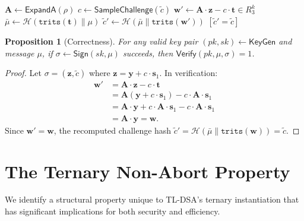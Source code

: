\documentclass[11pt,a4paper]{article}
\newtheorem{proposition}[theorem]{Proposition}
\theoremstyle{definition}
\newcommand{\linf}[1]{\left\lVert #1 \right\rVert_{\infty}}
\newcommand{\KeyGen}{\textsf{KeyGen}}
\newcommand{\Sign}{\textsf{Sign}}
\newcommand{\Verify}{\textsf{Verify}}
\begin{document}
\begin{algorithm}[H]
\caption{$\Verify(\textit{pk}, \mu, \sigma)$}
\label{alg:verify}
\DontPrintSemicolon
{}
\lIf{$\linf{\mathbf{z}} > \gamma$}{\Return $\bot$}
$\mathbf{A} \leftarrow \textsf{ExpandA}(\rho)$\;
$c \leftarrow \textsf{SampleChallenge}(\tilde{c})$\;
$\mathbf{w}' \leftarrow \mathbf{A} \cdot \mathbf{z} - c \cdot \mathbf{t} \in R_3^k$\;
$\bar{\mu} \leftarrow \mathcal{H}(\texttt{trits}(\mathbf{t}) \| \mu)$\;
$\tilde{c}' \leftarrow \mathcal{H}(\bar{\mu} \| \texttt{trits}(\mathbf{w}'))$\;
\Return $[\tilde{c}' = \tilde{c}]$\;
\end{algorithm}

\begin{proposition}[Correctness]
\label{prop:correct}
For any valid key pair $(\textit{pk}, \textit{sk}) \leftarrow \KeyGen$ and message $\mu$, if $\sigma \leftarrow \Sign(\textit{sk}, \mu)$ succeeds, then $\Verify(\textit{pk}, \mu, \sigma) = 1$.
\end{proposition}

\begin{proof}
Let $\sigma = (\mathbf{z}, \tilde{c})$ where $\mathbf{z} = \mathbf{y} + c \cdot \mathbf{s}_1$. In verification:
\begin{align*}
  \mathbf{w}' &= \mathbf{A} \cdot \mathbf{z} - c \cdot \mathbf{t} \\
  &= \mathbf{A}(\mathbf{y} + c \cdot \mathbf{s}_1) - c \cdot \mathbf{A} \cdot \mathbf{s}_1 \\
  &= \mathbf{A} \cdot \mathbf{y} + c \cdot \mathbf{A} \cdot \mathbf{s}_1 - c \cdot \mathbf{A} \cdot \mathbf{s}_1 \\
  &= \mathbf{A} \cdot \mathbf{y} = \mathbf{w}.
\end{align*}
Since $\mathbf{w}' = \mathbf{w}$, the recomputed challenge hash $\tilde{c}' = \mathcal{H}(\bar{\mu} \| \texttt{trits}(\mathbf{w})) = \tilde{c}$.
\end{proof}

\section{The Ternary Non-Abort Property}
\label{sec:ternary-advantage}

We identify a structural property unique to TL-DSA's ternary instantiation that has significant implications for both security and efficiency.
\end{document}
